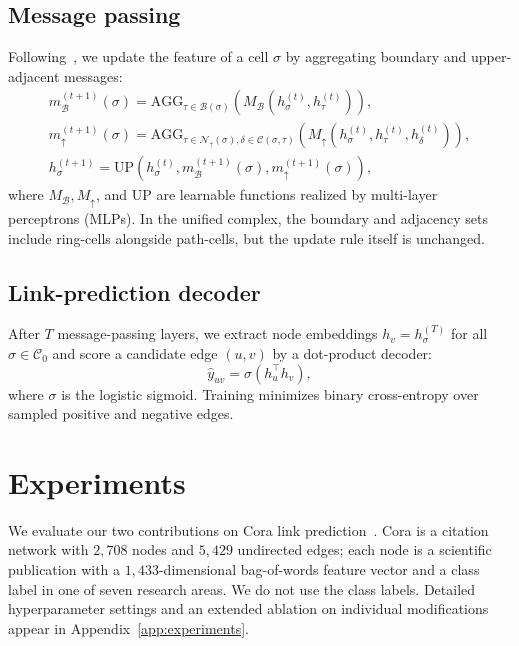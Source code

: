 \documentclass{article}
\begin{document}
\subsection{Message passing}
\label{subsec:mp}
Following~\citet{bodnar_weisfeiler_2022, truong_weisfeiler_2024}, we update the feature of a cell $\sigma$ by aggregating boundary and upper-adjacent messages:
\begin{gather*}
  m_\mathcal{B}^{(t+1)}(\sigma) = \mathrm{AGG}_{\tau \in \mathcal{B}(\sigma)} \left( M_\mathcal{B}(h_\sigma^{(t)}, h_\tau^{(t)}) \right), \\
  m_\uparrow^{(t+1)}(\sigma) = \mathrm{AGG}_{\tau \in \mathcal{N}_\uparrow(\sigma), \delta \in \mathcal{C}(\sigma, \tau)} \left( M_\uparrow(h_\sigma^{(t)}, h_\tau^{(t)}, h_\delta^{(t)}) \right), \\
  h_\sigma^{(t+1)} = \mathrm{UP}\left( h_\sigma^{(t)}, m_\mathcal{B}^{(t+1)}(\sigma), m_\uparrow^{(t+1)}(\sigma) \right),
\end{gather*}
where $M_\mathcal{B}, M_\uparrow$, and $\mathrm{UP}$ are learnable functions realized by multi-layer perceptrons (MLPs). In the unified complex, the boundary and adjacency sets include ring-cells alongside path-cells, but the update rule itself is unchanged.

\subsection{Link-prediction decoder}
\label{subsec:decoder}
After $T$ message-passing layers, we extract node embeddings $h_v = h_\sigma^{(T)}$ for all $\sigma \in \mathcal{C}_0$ and score a candidate edge $(u, v)$ by a dot-product decoder:
\[
  \hat{y}_{uv} = \sigma\left( h_u^\top h_v \right),
\]
where $\sigma$ is the logistic sigmoid. Training minimizes binary cross-entropy over sampled positive and negative edges.

\section{Experiments}
\label{section:experiments}

We evaluate our two contributions on Cora link prediction~\citep{sen_collective_2008, kipf_variational_2016}. Cora is a citation network with $2{,}708$ nodes and $5{,}429$ undirected edges; each node is a scientific publication with a $1{,}433$-dimensional bag-of-words feature vector and a class label in one of seven research areas. We do not use the class labels. Detailed hyperparameter settings and an extended ablation on individual modifications appear in Appendix~\ref{app:experiments}.
\end{document}
